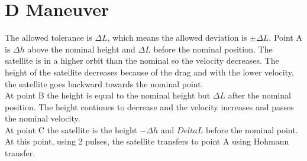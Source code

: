 \documentclass[11pt, a4paper]{article}
\begin{document}

\section{D Maneuver}
The allowed tolerance is $\Delta L$, which means the allowed deviation is $\pm\Delta L$. Point A is $\Delta h$ above the nominal height and $\Delta L$ before the nominal position. The satellite is in a higher orbit than the nominal so the velocity decreases. The height of the satellite decreases because of the drag and with the lower velocity, the satellite goes backward towards the nominal point.\\
At point B the height is equal to the nominal height but $\Delta L$ after the nominal position. The height continues to decrease and the velocity increases and passes the nominal velocity. \\
At point C the satellite is the height $-\Delta h$ and $Delta L$ before the nominal point. At this point, using 2 pulses, the satellite transfers to point A using Hohmann transfer.
\end{document}
